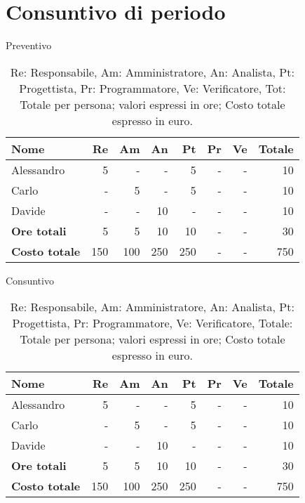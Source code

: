 \section{Consuntivo di periodo}

Preventivo
\begin{table}[H]
	\centering
	\begin{tabular}{l|r|r|r|r|r|r|r}
		\textbf{Nome}         & \textbf{Re} & \textbf{Am} & \textbf{An} & \textbf{Pt} & \textbf{Pr} & \textbf{Ve} & \textbf{Totale} \\
		\hline
		Alessandro            & 5           & -           & -           & 5           & -           & -           & 10              \\
		Carlo                 & -           & 5           & -           & 5           & -           & -           & 10              \\
		Davide                & -           & -           & 10          & -           & -           & -           & 10              \\
		\hline
		\textbf{Ore totali}   & 5           & 5           & 10          & 10          & -           & -           & 30              \\
		\textbf{Costo totale} & 150         & 100         & 250         & 250         & -           & -           & 750
	\end{tabular}
	\caption{Re: Responsabile, Am: Amministratore, An: Analista, Pt: Progettista,
		Pr: Programmatore, Ve: Verificatore, Tot: Totale per persona; valori espressi in ore; Costo totale espresso in euro.}
\end{table}
Consuntivo
\begin{table}[H]
	\centering
	\begin{tabular}{l|r|r|r|r|r|r|r}
		\textbf{Nome}         & \textbf{Re} & \textbf{Am} & \textbf{An} & \textbf{Pt} & \textbf{Pr} & \textbf{Ve} & \textbf{Totale} \\
		\hline
		Alessandro            & 5           & -           & -           & 5           & -           & -           & 10              \\
		Carlo                 & -           & 5           & -           & 5           & -           & -           & 10              \\
		Davide                & -           & -           & 10          & -           & -           & -           & 10              \\
		\hline
		\textbf{Ore totali}   & 5           & 5           & 10          & 10          & -           & -           & 30              \\
		\textbf{Costo totale} & 150         & 100         & 250         & 250         & -           & -           & 750
	\end{tabular}
	\caption{Re: Responsabile, Am: Amministratore, An: Analista, Pt: Progettista,
		Pr: Programmatore, Ve: Verificatore, Totale: Totale per persona; valori espressi in ore; Costo totale espresso in euro.}
\end{table}

